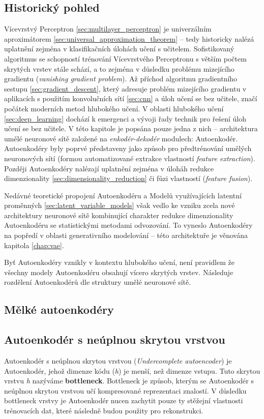 \subsection{Historický pohled}
Vícevrstvý Perceptron \autoref{sec:multilayer_perceptron} je univerzálním aproximátorem \autoref{sec:universal_approximation_theorem} – tedy historicky nalézá uplatnění zejména v klasifikačních úlohách učení s učitelem.
Sofistikovaný algoritmus se schopností trénování Vícevrstvého Perceptronu s větším počtem skrytých vrstev stále schází, a to zejména v důsledku problému mizejícího gradientu (\emph{vanishing gradient problem}).
Až příchod algoritmu gradientního sestupu \autoref{sec:gradient_descent}, který adresuje problém mizejícího gradientu v aplikacích s použitím konvolučních sítí \autoref{sec:cnn} a úloh učení se bez učitele, značí počátek moderních metod hlubokého učení.
V oblasti hlubokého učení \autoref{sec:deep_learning} dochází k emergenci a vývoji řady technik pro řešení úloh učení se bez učitele.
V této kapitole je popsána pouze jedna z nich – architektura umělé neuronové sítě založené na \emph{enkodér-dekodér} modulech: Autoenkodér.
Autoenkodéry byly poprvé představeny jako způsob pro předtrénování umělých neuronových sítí (formou automatizované extrakce vlastností \emph{feature extraction}). 
Později Autoenkodéry nalézají uplatnění zejména v úloháh redukce dimenzionality \autoref{sec:dimensionality_reduction} či fůzi vlastností (\emph{feature fusion}).


Nedávné teoretické propojení Autoenkodéru a Modelů využívajících latentní proměnných \autoref{sec:latent_variable_models} však vedlo ke vzniku zcela nové architektury neuronové sítě kombinující charakter redukce dimenzionality Autoenkodéru se statistickými metodami odvozování.
To vyneslo Autoenkodéry na popředí v oblasti generativního modelování – této architektuře je věnována kapitola \autoref{chap:vae}.

Byť Autoenkodéry vznikly v kontextu hlubokého učení, není pravidlem že všechny modely Autoenkodéru obsahují vícero skrytých vrstev. Následuje rozdělení Autoenkodérů dle struktury umělé neuronové sítě.

\subsection{Mělké autoenkodéry}
\label{sec:shallow_autoncoder}
\subsection{Autoenkodér s neúplnou skrytou vrstvou}
\label{sec:undercomplete_autoencoder}
Autoenkodér s neúplnou skrytou vrstvou (\emph{Undercomplete autoencoder}) je Autoenkodér, jehož dimenze kódu (\emph{h}) je menší, než dimenze vstupu.
Tuto skrytou vrstvu \emph{h} nazýváme \textbf{bottleneck}. Bottleneck je způsob, kterým se Autoenkodér s neúplnou skrytou vrstvou učí kompresované reprezentaci znalostí. 
V důsledku bottleneck vrstvy je Autoenkodér nucen zachytit pouze ty stěžejní vlastnosti trénovacích dat, které následně budou použity pro rekonstrukci.

